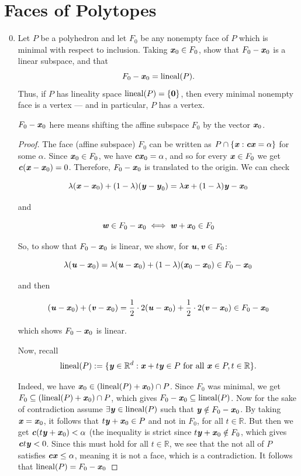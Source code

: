\documentclass{article}
\begin{document}
\bigskip
\section{Faces of Polytopes}
\begin{enumerate}
\setcounter{enumi}{-1}
\renewcommand{\labelenumi}{2.\arabic{enumi}}
\item Let $P$ be a polyhedron and let $F_0$ be any nonempty face of $P$ which is minimal with respect to inclusion. Taking $\textbf{\textit{x}}_0 \in F_0$, show that $F_0 - \textbf{\textit{x}}_0$ is a linear subspace, and that
\[F_0 -\textbf{\textit{x}}_0 = \operatorname{lineal}(P).\]
Thus, if $P$ has lineality space $\operatorname{lineal}(P) = \{\textbf{0}\}$, then every minimal nonempty face is a vertex — and in particular, $P$ has a vertex.
\begin{remark}
    $F_0 - \textbf{\textit{x}}_0$ here means shifting the affine subspace $F_0$ by the vector $\textbf{\textit{x}}_0$.
\end{remark}
\begin{proof}

The face (affine subspace) $F_0$ can be written as $P \cap \{\textbf{\textit{x}}: \textbf{\textit{cx}} = \alpha\}$ for some $\alpha$. Since $\textbf{\textit{x}}_0 \in F_0$, we have $\textbf{\textit{cx}}_0 = \alpha$, and so for every $\textbf{\textit{x}} \in F_0$ we get $\textbf{\textit{c}} (\textbf{\textit{x}} - \textbf{\textit{x}}_0)= 0$. Therefore, $F_0 - \textbf{\textit{x}}_0$ is translated to the origin. We can check

\[\lambda(\textbf{\textit{x}}-\textbf{\textit{x}}_0) + (1-\lambda)(\textbf{\textit{y}} - \textbf{\textit{y}}_0) = \lambda \textbf{\textit{x}} + (1-\lambda)\textbf{\textit{y}} - \textbf{\textit{x}}_0\]

and 

\[\textbf{\textit{w}} \in F_0 - \textbf{\textit{x}}_0 \iff \textbf{\textit{w}} + \textbf{\textit{x}}_0 \in F_0\]

So, to show that $F_0 - \textbf{\textit{x}}_0$ is linear, we show, for $\textbf{\textit{u}}, \textbf{\textit{v}} \in F_0$:

\[\lambda(\textbf{\textit{u}} - \textbf{\textit{x}}_0) = \lambda(\textbf{\textit{u}} - \textbf{\textit{x}}_0) + (1-\lambda)(\textbf{\textit{x}}_0 - \textbf{\textit{x}}_0) \in F_0 - \textbf{\textit{x}}_0\]

and then 

\[(\textbf{\textit{u}} - \textbf{\textit{x}}_0) + (\textbf{\textit{v}} - \textbf{\textit{x}}_0) = \frac{1}{2}\cdot 2(\textbf{\textit{u}} - \textbf{\textit{x}}_0) + \frac{1}{2}\cdot 2(\textbf{\textit{v}} - \textbf{\textit{x}}_0) \in F_0 - \textbf{\textit{x}}_0\]

which shows $F_0 - \textbf{\textit{x}}_0$ is linear.

\smallskip
Now, recall
\[\operatorname{lineal}(P):= \{\textbf{\textit{y}} \in \mathbb{R}^d: \textbf{\textit{x}}+t\textbf{\textit{y}} \in P \textup{ for all }\textbf{\textit{x}} \in P, t \in \mathbb{R}\}.\]

Indeed, we have $\textbf{\textit{x}}_0 \in (\operatorname{lineal}(P) + \textbf{\textit{x}}_0) \cap P$. Since $F_0$ was minimal, we get $F_0 \subseteq (\operatorname{lineal}(P) + \textbf{\textit{x}}_0) \cap P$, which gives $F_0 - \textbf{\textit{x}}_0 \subseteq \operatorname{lineal}(P)$. Now for the sake of contradiction assume $\exists \textbf{\textit{y}} \in \operatorname{lineal}(P)$ such that $\textbf{\textit{y}} \notin F_0 - \textbf{\textit{x}}_0$. By taking $\textbf{\textit{x}} = \textbf{\textit{x}}_0$, it follows that $t\textbf{\textit{y}}+\textbf{\textit{x}}_0 \in P$ and not in $F_0$, for all $t\in \mathbb{R}$. But then we get $\textbf{\textit{c}}(t\textbf{\textit{y}}+\textbf{\textit{x}}_0) < \alpha$ (the inequality is strict since $t\textbf{\textit{y}} + \textbf{\textit{x}}_0 \notin F_0$, which gives $\textbf{\textit{c}}t\textbf{\textit{y}} < 0$. Since this must hold for all $t \in \mathbb{R}$, we see that the not all of $P$ satisfies $\textbf{\textit{cx}} \leq \alpha$, meaning it is not a face, which is a contradiction. It follows that $\operatorname{lineal}(P) = F_0 - \textbf{\textit{x}}_0$


\end{proof}
\end{enumerate}
\end{document}
